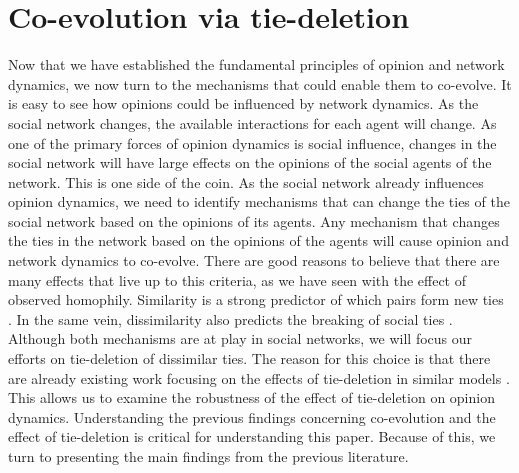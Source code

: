 \documentclass{article}
\begin{document}
\section{Co-evolution via tie-deletion}
Now that we have established the fundamental principles of opinion and network dynamics, we now turn to the mechanisms that could enable them to co-evolve. 
It is easy to see how opinions could be influenced by network dynamics. 
As the social network changes, the available interactions for each agent will change. 
As one of the primary forces of opinion dynamics is social influence, changes in the social network will have large effects on the opinions of the social agents of the network. 
This is one side of the coin. As the social network already influences opinion dynamics, we need to identify mechanisms that can change the ties of the social network based on the opinions of its agents. 
Any mechanism that changes the ties in the network based on the opinions of the agents will cause opinion and network dynamics to co-evolve. 
There are good reasons to believe that there are many effects that live up to this criteria, as we have seen with the effect of observed homophily. 
Similarity is a strong predictor of which pairs form new ties \cite{bener_empirical_2016,kossinets_origins_2009}.
In the same vein, dissimilarity also predicts the breaking of social ties \cite{bener_empirical_2016,kossinets_origins_2009,levin_dynamics_2021}. 
Although both mechanisms are at play in social networks, we will focus our efforts on tie-deletion of dissimilar ties. 
The reason for this choice is that there are already existing work focusing on the effects of tie-deletion in similar models \cite{santos_cooperation_2006,sasahara_social_2021}. 
This allows us to examine the robustness of the effect of tie-deletion on opinion dynamics. 
Understanding the previous findings concerning co-evolution and the effect of tie-deletion is critical for understanding this paper. Because of this, we turn to presenting the main findings from the previous literature. 
\end{document}

